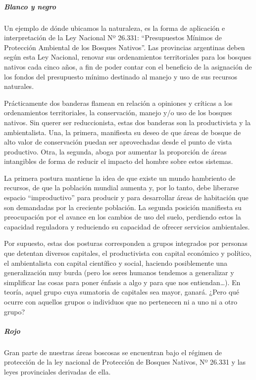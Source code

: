 \documentclass[
]{article}
\begin{document}
\hypertarget{blanco-y-negro}{%
\subparagraph{Blanco y negro}\label{blanco-y-negro}}

Un ejemplo de dónde ubicamos la naturaleza, es la forma de aplicación e
interpretación de la Ley Nacional Nº 26.331: ``Presupuestos Mínimos de
Protección Ambiental de los Bosques Nativos''. Las provincias argentinas
deben según esta Ley Nacional, renovar sus ordenamientos territoriales
para los bosques nativos cada cinco años, a fin de poder contar con el
beneficio de la asignación de los fondos del presupuesto mínimo
destinado al manejo y uso de sus recursos naturales.

Prácticamente dos banderas flamean en relación a opiniones y críticas a
los ordenamientos territoriales, la conservación, manejo y/o uso de los
bosques nativos. Sin querer ser reduccionista, estas dos banderas son la
productivista y la ambientalista. Una, la primera, manifiesta su deseo
de que áreas de bosque de alto valor de conservación puedan ser
aprovechadas desde el punto de vista productivo. Otra, la segunda, aboga
por aumentar la proporción de áreas intangibles de forma de reducir el
impacto del hombre sobre estos sistemas.

La primera postura mantiene la idea de que existe un mundo hambriento de
recursos, de que la población mundial aumenta y, por lo tanto, debe
liberarse espacio ``improductivo'' para producir y para desarrollar
áreas de habitación que son demandadas por la creciente población. La
segunda posición manifiesta su preocupación por el avance en los cambios
de uso del suelo, perdiendo estos la capacidad reguladora y reduciendo
su capacidad de ofrecer servicios ambientales.

Por supuesto, estas dos posturas corresponden a grupos integrados por
personas que detentan diversos capitales, el productivista con capital
económico y político, el ambientalista con capital científico y social,
haciendo posiblemente una generalización muy burda (pero los seres
humanos tendemos a generalizar y simplificar las cosas para poner
énfasis a algo y para que nos entiendan\ldots). En teoría, aquel grupo
cuya sumatoria de capitales sea mayor, ganará. ¿Pero qué ocurre con
aquellos grupos o individuos que no pertenecen ni a uno ni a otro grupo?

\hypertarget{rojo}{%
\subparagraph{Rojo}\label{rojo}}

Gran parte de nuestras áreas boscosas se encuentran bajo el régimen de
protección de la ley nacional de Protección de Bosques Nativos, Nº
26.331 y las leyes provinciales derivadas de ella.
\end{document}
